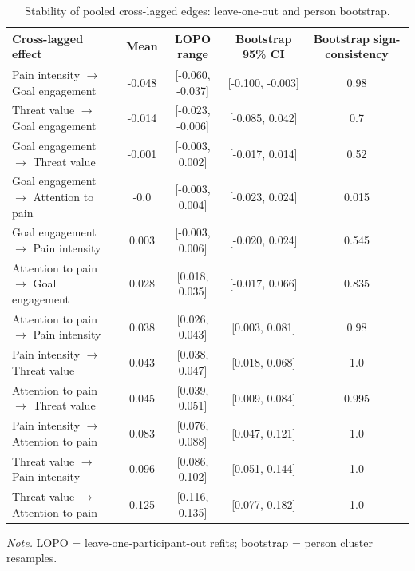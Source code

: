 \begin{table}[H]
\raggedright
\caption{Stability of pooled cross-lagged edges: leave-one-out and person bootstrap.}
\label{tab:robust}
\footnotesize
\begingroup
\setlength{\tabcolsep}{4pt}
\renewcommand{\arraystretch}{1.08}
\noindent
\begin{tabular*}{\textwidth}{@{\extracolsep{\fill}}lcccc@{}}
\toprule
Cross-lagged effect & Mean & LOPO range & Bootstrap 95\% CI & Bootstrap sign-consistency \\
\midrule
Pain intensity $\rightarrow$ Goal engagement & -0.048 & [-0.060, -0.037] & [-0.100, -0.003] & 0.98 \\
Threat value $\rightarrow$ Goal engagement & -0.014 & [-0.023, -0.006] & [-0.085, 0.042] & 0.7 \\
Goal engagement $\rightarrow$ Threat value & -0.001 & [-0.003, 0.002] & [-0.017, 0.014] & 0.52 \\
Goal engagement $\rightarrow$ Attention to pain & -0.0 & [-0.003, 0.004] & [-0.023, 0.024] & 0.015 \\
Goal engagement $\rightarrow$ Pain intensity & 0.003 & [-0.003, 0.006] & [-0.020, 0.024] & 0.545 \\
Attention to pain $\rightarrow$ Goal engagement & 0.028 & [0.018, 0.035] & [-0.017, 0.066] & 0.835 \\
Attention to pain $\rightarrow$ Pain intensity & 0.038 & [0.026, 0.043] & [0.003, 0.081] & 0.98 \\
Pain intensity $\rightarrow$ Threat value & 0.043 & [0.038, 0.047] & [0.018, 0.068] & 1.0 \\
Attention to pain $\rightarrow$ Threat value & 0.045 & [0.039, 0.051] & [0.009, 0.084] & 0.995 \\
Pain intensity $\rightarrow$ Attention to pain & 0.083 & [0.076, 0.088] & [0.047, 0.121] & 1.0 \\
Threat value $\rightarrow$ Pain intensity & 0.096 & [0.086, 0.102] & [0.051, 0.144] & 1.0 \\
Threat value $\rightarrow$ Attention to pain & 0.125 & [0.116, 0.135] & [0.077, 0.182] & 1.0 \\
\bottomrule
\end{tabular*}
\par\vspace{3pt}\noindent\parbox{\textwidth}{\footnotesize\textit{Note.} LOPO = leave-one-participant-out refits; bootstrap = person cluster resamples.}
\endgroup
\end{table}
